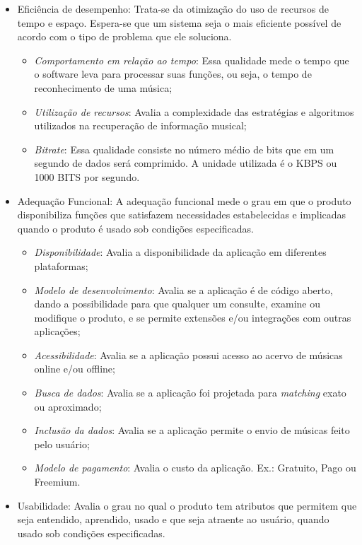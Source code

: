 \begin{itemize}
    \item Eficiência de desempenho: Trata-se da otimização do uso de recursos de tempo e espaço. Espera-se que um sistema seja o mais eficiente possível de acordo com o tipo de problema que ele soluciona.
    \begin{itemize}
        \item \textit{Comportamento em relação ao tempo}: Essa qualidade mede o tempo que o software leva para processar suas funções, ou seja, o tempo de reconhecimento de uma música;
        \item \textit{Utilização de recursos}: Avalia a complexidade das estratégias e algoritmos utilizados na recuperação de informação musical;
        \item \textit{Bitrate}: Essa qualidade consiste no número médio de bits que em um segundo de dados será comprimido. A unidade utilizada é o KBPS ou 1000 BITS por segundo.
    \end{itemize}
    \item Adequação Funcional: A adequação funcional mede o grau em que o produto disponibiliza funções que satisfazem necessidades estabelecidas e implicadas quando o produto é usado sob condições especificadas.
    \begin{itemize}
        \item \textit{Disponibilidade}: Avalia a disponibilidade da aplicação em diferentes plataformas;
        \item \textit{Modelo de desenvolvimento}: Avalia se a aplicação é de código aberto, dando a possibilidade para que qualquer um consulte, examine ou modifique o produto, e se permite extensões e/ou integrações com outras aplicações;
        \item \textit{Acessibilidade}: Avalia se a aplicação possui acesso ao acervo de músicas online e/ou offline;
        \item \textit{Busca de dados}: Avalia se a aplicação foi projetada para \textit{matching} exato ou aproximado;
        \item \textit{Inclusão da dados}: Avalia se a aplicação permite o envio de músicas feito pelo usuário;
        \item \textit{Modelo de pagamento}: Avalia o custo da aplicação. Ex.: Gratuito, Pago ou Freemium.
    \end{itemize}
    \item Usabilidade: Avalia o grau no qual o produto tem atributos que permitem que seja entendido, aprendido, usado e que seja atraente ao usuário, quando usado sob condições especificadas.

\end{itemize}
